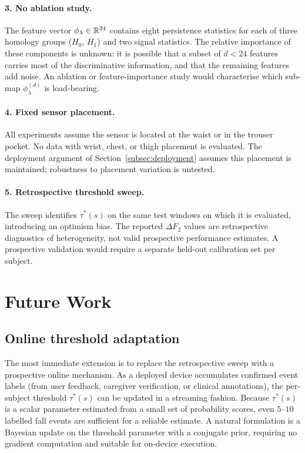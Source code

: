 \paragraph{3. No ablation study.}
The feature vector $\phi_\lambda\in\mathbb{R}^{24}$ contains eight persistence statistics
for each of three homology groups ($H_0$, $H_1$) and two signal statistics.  The
relative importance of these components is unknown: it is possible that a subset of
$d<24$ features carries most of the discriminative information, and that the
remaining features add noise.  An ablation or feature-importance study would
characterise which sub-map $\phi_\lambda^{(d)}$ is load-bearing.

\paragraph{4. Fixed sensor placement.}
All experiments assume the sensor is located at the waist or in the trouser pocket.
No data with wrist, chest, or thigh placement is evaluated.  The deployment argument
of Section~\ref{subsec:deployment} assumes this placement is maintained; robustness
to placement variation is untested.

\paragraph{5. Retrospective threshold sweep.}
The sweep identifies $\tau^*(s)$ on the same test windows on which it is evaluated,
introducing an optimism bias.  The reported $\overline{\Delta F_2}$ values are
retrospective diagnostics of heterogeneity, not valid prospective performance
estimates.  A prospective validation would require a separate held-out calibration
set per subject.

\section{Future Work}
\label{subsec:future-work}

\subsection{Online threshold adaptation}

The most immediate extension is to replace the retrospective sweep with a prospective
online mechanism.  As a deployed device accumulates confirmed event labels (from user
feedback, caregiver verification, or clinical annotations), the per-subject threshold
$\tau^*(s)$ can be updated in a streaming fashion.  Because $\tau^*(s)$ is a scalar
parameter estimated from a small set of probability scores, even $5$--$10$ labelled
fall events are sufficient for a reliable estimate.  A natural formulation is a
Bayesian update on the threshold parameter with a conjugate prior, requiring no
gradient computation and suitable for on-device execution.

